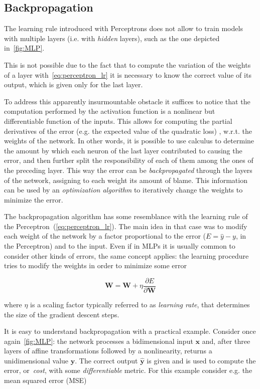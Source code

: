 \subsection{Backpropagation}\label{sec:backprop}
The learning rule introduced with Perceptrons does not allow to train models
with multiple layers (i.e. with \emph{hidden} layers), such as the one depicted
in~\autoref{fig:MLP}.

This is not possible due to the fact that to compute the variation of the
weights of a layer with~\autoref{eq:perceptron_lr} it is necessary to know the
correct value of its output, which is given only for the last layer.

To address this apparently insurmountable obstacle it suffices to notice that
the computation performed by the activation function is a nonlinear but
differentiable function of the inputs. This allows for computing the partial
derivatives of the error (e.g. the expected value of the quadratic loss) ,
w.r.t. the weights of the network. In other words, it is possible to use
calculus to determine the amount by which each neuron of the last layer
contributed to causing the error, and then further split the responsibility of
each of them among the ones of the preceding layer. This way the error can be
\emph{backpropagated} through the layers of the network, assigning to each
weight its amount of blame. This information can be used by an
\emph{optimization algorithm} to iteratively change the weights to minimize the
error.

The backpropagation algorithm has some resemblance with the learning rule of
the Perceptron~(\autoref{eq:perceptron_lr}). The main idea in that case was
to modify each weight of the network by a factor proportional to the error
($E = \hat y - y$, in the Perceptron) and to the input. Even if in MLPs it is
usually common to consider other kinds of errors, the same concept applies: the
learning procedure tries to modify the weights in order to minimize some error

\begin{equation}
    \mathbf{W} = \mathbf{W} + \eta \frac{\partial E}{\partial \mathbf{W}}
\end{equation}

\noindent where $\eta$ is a scaling factor typically referred to as
\emph{learning rate}, that determines the size of the gradient descent steps.

It is easy to understand backpropagation with a practical example. Consider
once again~\autoref{fig:MLP}: the network processes a bidimensional input
$\mathbf{x}$ and, after three layers of affine transformations followed by a
nonlinearity, returns a unidimensional value $\mathbf{y}$. The correct output
$\mathbf{\hat y}$ is given and is used to compute the error, or~\emph{cost},
with some \emph{differentiable} metric. For this example consider e.g. the mean
squared error (MSE)

